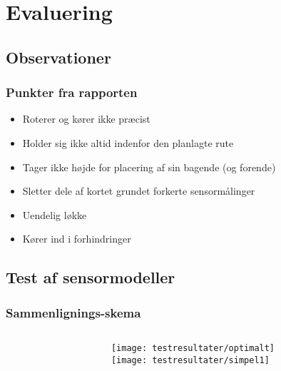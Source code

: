 \section{Evaluering}

\subsection{Observationer}

\begin{frame}
\frametitle{Punkter fra rapporten}
\begin{itemize}
\item Roterer og kører ikke præcist
\item Holder sig ikke altid indenfor den planlagte rute
\item Tager ikke højde for placering af sin bagende (og forende)
\item Sletter dele af kortet grundet forkerte sensormålinger
\item Uendelig løkke
\item Kører ind i forhindringer
\end{itemize}
\end{frame}

\subsection{Test af sensormodeller}
\begin{frame}
\frametitle{Sammenlignings-skema}
\begin{columns}
\begin{column}{.59\textwidth}
\begin{center}

\end{center}
\end{column}
\begin{column}{.40\textwidth}
\texttt{[image: testresultater/optimalt]}\\
\texttt{[image: testresultater/simpel1]}
\end{column}
\end{columns}
\end{frame}